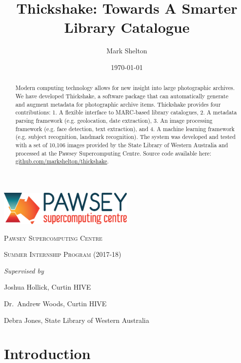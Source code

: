 \documentclass[10pt, a4paper]{article}
\title{Thickshake: Towards A Smarter Library Catalogue}
\author{Mark Shelton}
\date{\today}
\begin{document}
\begin{titlepage}
  \centering
  \includegraphics[width=0.5\textwidth]{figures/pawsey}\par\vspace{1cm}
  {\scshape\LARGE Pawsey Supercomputing Centre \par}\vspace{0.5cm}
  {\scshape\Large Summer Internship Program (2017-18) \par}\vspace{2cm}
  {\LARGE\bfseries\thetitle\par}\vspace{2cm}
  {\Large\theauthor\par}\vfill
  {\large\em Supervised by\par}\vspace{0.5cm}
  Joshua Hollick, Curtin HIVE\par
  Dr.~Andrew Woods, Curtin HIVE\par
  Debra Jones, State Library of Western Australia\vfill
  {\large\thedate\par}
\end{titlepage}

\begin{abstract}
Modern computing technology allows for new insight into large photographic archives. We have developed Thickshake, a software package that can automatically generate and augment metadata for photographic archive items. Thickshake provides  four contributions: 1. A flexible interface to MARC-based library catalogues, 2. A metadata parsing framework (e.g. geolocation, date extraction), 3. An image processing framework (e.g. face detection, text extraction), and 4. A machine learning framework (e.g. subject recognition, landmark recognition). The system was developed and tested with a set of 10,106 images provided by the State Library of Western Australia and processed at the Pawsey Supercomputing Centre. Source code available here: \url{github.com/markshelton/thickshake}.
\end{abstract}

\section{Introduction}
\label{section:introduction}
\end{document}
